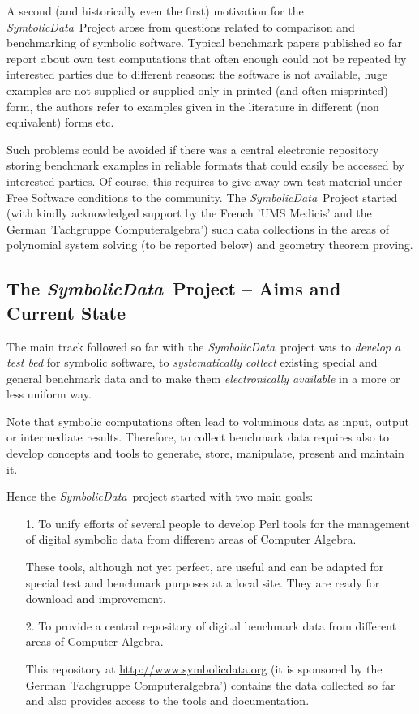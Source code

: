 \documentclass[11pt]{article}
\newcommand{\SD}{{\em Symbo\-lic\-Data}}
\begin{document}
A second (and historically even the first) motivation for the \SD\
Project arose from questions related to comparison and benchmarking of
symbolic software. Typical benchmark papers published so far report
about own test computations that often enough could not be repeated by
interested parties due to different reasons: the software is not
available, huge examples are not supplied or supplied only in printed
(and often misprinted) form, the authors refer to examples given in
the literature in different (non equivalent) forms etc.

Such problems could be avoided if there was a central electronic
repository storing benchmark examples in reliable formats that
could easily be accessed by interested parties. Of course, this
requires to give away own test material under Free Software
conditions to the community.  The \SD\ Project started (with
kindly acknowledged support by the French 'UMS Medicis' and the
German 'Fachgruppe Computeralgebra') such data collections in the
areas of polynomial system solving (to be reported below) and
geometry theorem proving. 

\subsection{The \SD\ Project -- Aims and Current State}

The main track followed so far with the \SD\ project was to {\em
develop a test bed} for symbolic software, to {\em systematically
collect} existing special and general benchmark data and to make them
{\em electronically available} in a more or less uniform way.

Note that symbolic computations often lead to voluminous data as
input, output or intermediate results. Therefore, to collect benchmark
data requires also to develop concepts and tools to generate, store,
manipulate, present and maintain it.
\pagebreak

Hence the \SD\ project started with two main goals: 
\begin{itemize}
\item[1.] To unify efforts of several people to develop Perl
tools for the management of digital symbolic data from different
areas of Computer Algebra.

These tools, although not yet perfect, are useful and can be adapted
for special test and benchmark purposes at a local site. They are
ready for download and improvement.

\item[2.] To provide a central repository of digital benchmark
data from different areas of Computer Algebra.

This repository at \url{http://www.symbolicdata.org} (it is sponsored
by the German 'Fachgruppe Computeralgebra') contains the data
collected so far and also provides access to the tools and
documentation.
\end{itemize}
\end{document}
